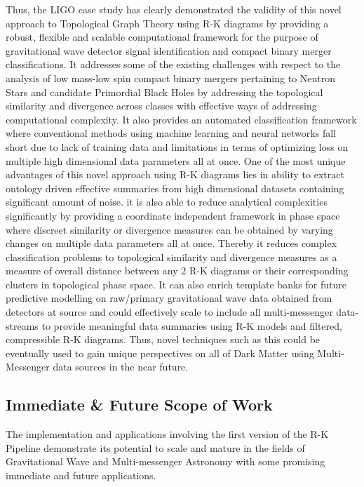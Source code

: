 Thus, the LIGO case study has clearly demonstrated the validity of this novel approach to Topological Graph Theory using R-K diagrams by providing a robust, flexible and scalable computational framework for the purpose of gravitational wave detector signal identification and compact binary merger classifications. It addresses some of the existing challenges with respect to the analysis of low mass-low spin compact binary mergers pertaining to Neutron Stars and candidate Primordial Black Holes by addressing the topological similarity and divergence across classes with effective ways of addressing computational complexity. It also provides an automated classification framework where conventional methods using machine learning and neural networks fall short due to lack of training data and limitations in terms of optimizing loss on multiple high dimensional data parameters all at once. One of the most unique advantages of this novel approach using R-K diagrams lies in ability to extract ontology driven effective summaries from high dimensional datasets containing significant amount of noise. it is also able to reduce analytical complexities significantly by providing a coordinate independent framework in phase space where discreet similarity or divergence measures can be obtained by varying changes on multiple data parameters all at once. Thereby it reduces complex classification problems to topological similarity and divergence measures as a measure of overall distance between any 2 R-K diagrams or their corresponding clusters in topological phase space. It can also enrich template banks for future predictive modelling on raw/primary gravitational wave data obtained from detectors at source and could effectively scale to include all multi-messenger data-streams to provide meaningful data summaries using R-K models and filtered, compressible R-K diagrams. Thus, novel techniques such as this could be eventually used to gain unique perspectives on all of Dark Matter using Multi-Messenger data sources in the near future.

\subsection{Immediate \& Future Scope of Work}

The implementation and applications involving the first version of the R-K Pipeline demonstrate its potential to scale and mature in the fields of Gravitational Wave and Multi-messenger Astronomy with some promising immediate and future applications. 

